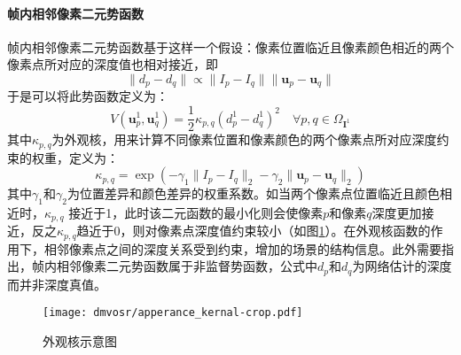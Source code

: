 \paragraph{帧内相邻像素二元势函数}
帧内相邻像素二元势函数基于这样一个假设：像素位置临近且像素颜色相近的两个像素点所对应的深度值也相对接近，即
\begin{equation}
    \|d_p - d_q\| \propto \|I_p-I_q\|\|\mathbf{u}_p-\mathbf{u}_q\|
\end{equation}
于是可以将此势函数定义为：
\begin{equation}
    V(\mathbf{u}_p^1,\mathbf{u}_q^1) = \frac{1}{2} \kappa_{p,q}(d_p^1-d_q^1)^2 \quad \forall p,q \in \Omega_{\mathbf{I}^1}
\end{equation}
其中$\kappa_{p,q}$为外观核，用来计算不同像素位置和像素颜色的两个像素点所对应深度约束的权重，定义为：
\begin{equation}
    \kappa_{p,q}= \exp(-\gamma_1\|I_p-I_q\|_2 - \gamma_2\|\mathbf{u}_p-\mathbf{u}_q\|_2)
\end{equation}
其中$\gamma_1$和$\gamma_2$为位置差异和颜色差异的权重系数。如当两个像素点位置临近且颜色相近时，$\kappa_{p,q}$
接近于1，此时该二元函数的最小化则会使像素$p$和像素$q$深度更加接近，反之$\kappa_{p,q}$趋近于0，则对像素点深度值约束较小（如图\ref{fig:deepsr_apperance_kernal}）。在外观核函数的作用下，相邻像素点之间的深度关系受到约束，增加的场景的结构信息。此外需要指出，帧内相邻像素二元势函数属于非监督势函数，公式中$d_p$和$d_q$为网络估计的深度而并非深度真值。

\begin{figure}[h]
    \centering
    \texttt{[image: dmvosr/apperance\_kernal-crop.pdf]}
    \caption{外观核示意图}
    \label{fig:deepsr_apperance_kernal}
\end{figure}


